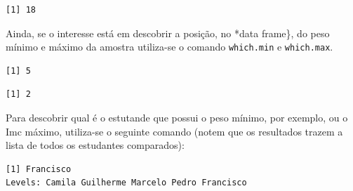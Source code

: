 \documentclass[12pt,brazil,oneside]{book}
\newenvironment{Shaded}{\begin{snugshade}}{\end{snugshade}}
\newcommand{\CommentTok}[1]{\textcolor[rgb]{0.56,0.35,0.01}{\textit{#1}}}
\newcommand{\KeywordTok}[1]{\textcolor[rgb]{0.13,0.29,0.53}{\textbf{#1}}}
\newcommand{\NormalTok}[1]{#1}
\newcommand{\OperatorTok}[1]{\textcolor[rgb]{0.81,0.36,0.00}{\textbf{#1}}}
\begin{document}
\begin{Shaded}
\end{Shaded}

\begin{verbatim}
[1] 18
\end{verbatim}

Ainda, se o interesse está em descobrir a posição, no *data frame\}, do peso mínimo e máximo da amostra utiliza-se o comando \texttt{which.min} e \texttt{which.max}.

\begin{Shaded}
\end{Shaded}

\begin{verbatim}
[1] 5
\end{verbatim}

\begin{Shaded}
\end{Shaded}

\begin{verbatim}
[1] 2
\end{verbatim}

Para descobrir qual é o estutande que possui o peso mínimo, por exemplo, ou o Imc máximo, utiliza-se o seguinte comando (notem que os resultados trazem a lista de todos os estudantes comparados):

\begin{Shaded}
\end{Shaded}

\begin{verbatim}
[1] Francisco
Levels: Camila Guilherme Marcelo Pedro Francisco
\end{verbatim}
\end{document}

